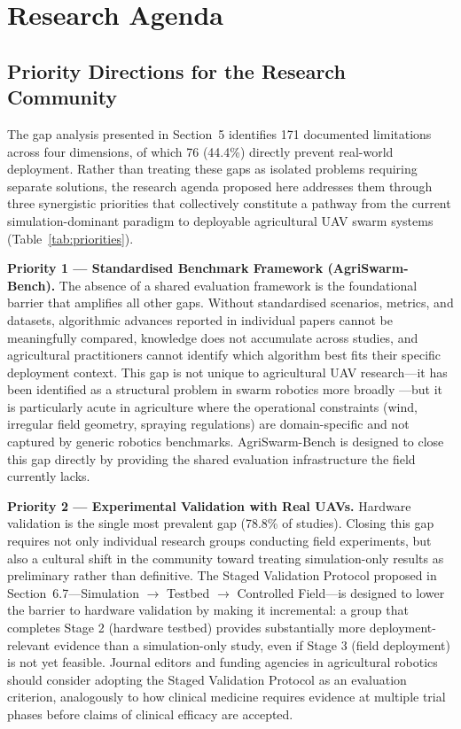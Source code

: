 \documentclass[review,3p,times]{elsarticle}
\begin{document}
\section{Research Agenda}

\subsection{Priority Directions for the Research Community}

The gap analysis presented in Section~5 identifies 171 documented limitations across four dimensions, of which 76 (44.4\%) directly prevent real-world deployment. Rather than treating these gaps as isolated problems requiring separate solutions, the research agenda proposed here addresses them through three synergistic priorities that collectively constitute a pathway from the current simulation-dominant paradigm to deployable agricultural UAV swarm systems (Table~\ref{tab:priorities}).

\textbf{Priority 1 --- Standardised Benchmark Framework (AgriSwarm-Bench).} The absence of a shared evaluation framework is the foundational barrier that amplifies all other gaps. Without standardised scenarios, metrics, and datasets, algorithmic advances reported in individual papers cannot be meaningfully compared, knowledge does not accumulate across studies, and agricultural practitioners cannot identify which algorithm best fits their specific deployment context. This gap is not unique to agricultural UAV research---it has been identified as a structural problem in swarm robotics more broadly \cite{brambilla2013}---but it is particularly acute in agriculture where the operational constraints (wind, irregular field geometry, spraying regulations) are domain-specific and not captured by generic robotics benchmarks. AgriSwarm-Bench is designed to close this gap directly by providing the shared evaluation infrastructure the field currently lacks.

\textbf{Priority 2 --- Experimental Validation with Real UAVs.} Hardware validation is the single most prevalent gap (78.8\% of studies). Closing this gap requires not only individual research groups conducting field experiments, but also a cultural shift in the community toward treating simulation-only results as preliminary rather than definitive. The Staged Validation Protocol proposed in Section~6.7---Simulation $\rightarrow$ Testbed $\rightarrow$ Controlled Field---is designed to lower the barrier to hardware validation by making it incremental: a group that completes Stage 2 (hardware testbed) provides substantially more deployment-relevant evidence than a simulation-only study, even if Stage 3 (field deployment) is not yet feasible. Journal editors and funding agencies in agricultural robotics should consider adopting the Staged Validation Protocol as an evaluation criterion, analogously to how clinical medicine requires evidence at multiple trial phases before claims of clinical efficacy are accepted.
\end{document}
